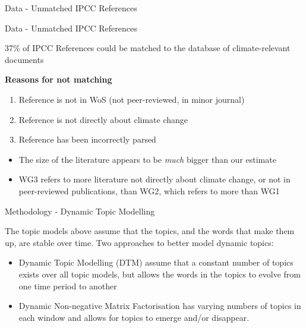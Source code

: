 \documentclass[9pt]{beamer}
\begin{document}
\begin{frame}{Data - Unmatched IPCC References}
\tiny

\end{frame}

\begin{frame}{Data - Unmatched IPCC References}

37\% of IPCC References could be matched to the database of climate-relevant documents

\medskip

\textbf{Reasons for not matching}
\begin{enumerate}
\item<2->Reference is not in WoS (not peer-reviewed, in minor journal)
\item<3->Reference is not directly about climate change
\item<4->Reference has been incorrectly parsed
\end{enumerate}

\medskip

\begin{itemize}
\item<5-> The size of the literature appears to be \textit{much} bigger than our estimate
\item<6-> WG3 refers to more literature not directly about climate change, or not in peer-reviewed publications, than WG2, which refers to more than WG1
\end{itemize}

\end{frame}

\begin{frame}{Methodology - Dynamic Topic Modelling}

The topic models above assume that the topics, and the words that make them up, are stable over time. Two approaches to better model dynamic topics:

\begin{itemize}
\item<2->Dynamic Topic Modelling (DTM) \citep{Blei2006} assume that a constant number of topics exists over all topic models, but allows the words in the topics to evolve from one time period to another
\item<3->Dynamic Non-negative Matrix Factorisation \citep{Greene2016} has varying numbers of topics in each window and allows for topics to emerge and/or disappear.
\end{itemize}


\end{frame}
\end{document}
